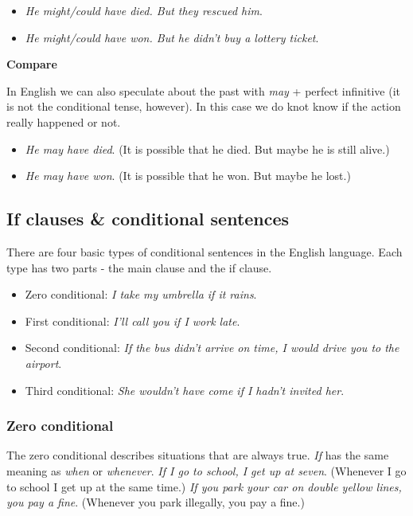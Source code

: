 \begin{itemize}

\item \textit{He might/could have died. But they rescued him}.
\item \textit{He might/could have won. But he didn't buy a lottery ticket}. 
\end{itemize}

\textbf{Compare}

In English we can also speculate about the past with \textit{may} + perfect infinitive (it is not the conditional tense, however). In this case we do knot know if the action really happened or not.

\begin{itemize}

\item \textit{He may have died}. (It is possible that he died. But maybe he is still alive.) 
\item \textit{He may have won}. (It is possible that he won. But maybe he lost.)
\end{itemize}

\subsection{If clauses \& conditional sentences}

There are four basic types of conditional sentences in the English language. Each type has two parts - the main clause and the if clause.

\begin{itemize}

\item Zero conditional: \textit{I take my umbrella if it rains}.
\item First conditional: \textit{I'll call you if I work late}.
\item Second conditional: \textit{If the bus didn't arrive on time, I would drive you to the airport}.
\item Third conditional: \textit{She wouldn't have come if I hadn't invited her}.

\end{itemize}

\subsubsection{Zero conditional}

The zero conditional describes situations that are always true. \textit{If} has the same meaning as \textit{when} or \textit{whenever}.
\textit{If I go to school, I get up at seven}. (Whenever I go to school I get up at the same time.)
\textit{If you park your car on double yellow lines, you pay a fine}. (Whenever you park illegally, you pay a fine.)

